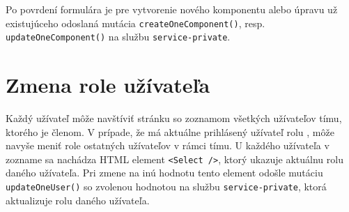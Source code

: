 \noindent Po povrdení formulára je pre vytvorenie nového komponentu alebo úpravu už existujúceho odoslaná mutácia \texttt{createOneComponent()}, resp. \texttt{updateOneComponent()} na službu \texttt{service-private}.

\section{Zmena role užívateľa}
Každý užívateľ môže navštíviť stránku so zoznamom všetkých užívateľov tímu, ktorého je členom. V prípade, že má aktuálne prihlásený užívateľ rolu , môže navyše meniť role ostatných užívateľov v rámci tímu. U každého užívateľa v zozname sa nachádza HTML element \texttt{<Select />}, ktorý ukazuje aktuálnu rolu daného užívateľa. Pri zmene na inú hodnotu tento element odošle mutáciu \texttt{updateOneUser()} so zvolenou hodnotou na službu \texttt{service-private}, ktorá aktualizuje rolu daného užívateľa.